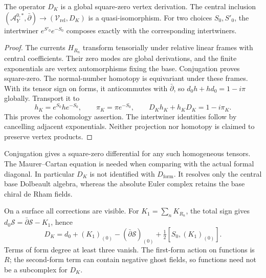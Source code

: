 \begin{proposition}\label{cyprim:prop:curved-Koszul}
The operator $D_K$ is a global square-zero
vertex derivation. The central inclusion
$(\mathcal A_Y^{0,*},\bar\partial)
\to(\mathcal V_{\mathrm{rel}},D_K)$ is a
quasi-isomorphism. For two choices $S_0,S'_0$,
the intertwiner $e^{S'_0}e^{-S_0}$ composes
exactly with the corresponding intertwiners.
\end{proposition}

\begin{proof}
The currents $H_{R_n}$ transform tensorially
under relative linear frames with central
coefficients. Their zero modes are global
derivations, and the finite exponentials
are vertex automorphisms fixing the base.
Conjugation proves square-zero.
The normal-number homotopy is equivariant
under these frames. With its tensor sign
on forms, it anticommutes with $\bar\partial$,
so $d_0h+hd_0=1-i\pi$ globally.
Transport it to
\[
 h_K=e^{S_0}he^{-S_0},\qquad
 \pi_K=\pi e^{-S_0},\qquad
 D_Kh_K+h_KD_K=1-i\pi_K.
\]
This proves the cohomology assertion. The
intertwiner identities follow by cancelling
adjacent exponentials. Neither projection
nor homotopy is claimed to preserve vertex
products.
\end{proof}

Conjugation gives a square-zero differential for any
such homogeneous tensors. The Maurer--Cartan equation
is needed when comparing with the actual formal diagonal.
In particular $D_K$ is not identified with
$D_{\mathrm{form}}$. It resolves only the
central base Dolbeault algebra, whereas the
absolute Euler complex retains the base
chiral de Rham fields.

On a surface all corrections are visible.
For $K_1=\sum_nK_{R_n}$, the total sign gives
$d_0\mathscr S=\bar\partial\mathscr S-K_1$, hence
\begin{equation}\label{cyprim:eq:surface-curvature}
 D_K=d_0+(K_1)_{(0)}
      -(\bar\partial\mathscr S)_{(0)}
      +\tfrac12[S_0,(K_1)_{(0)}].
\end{equation}
Terms of form degree at least three vanish.
The first-form action on functions is $R$;
the second-form term can contain negative
ghost fields, so functions need not be a
subcomplex for $D_K$.

